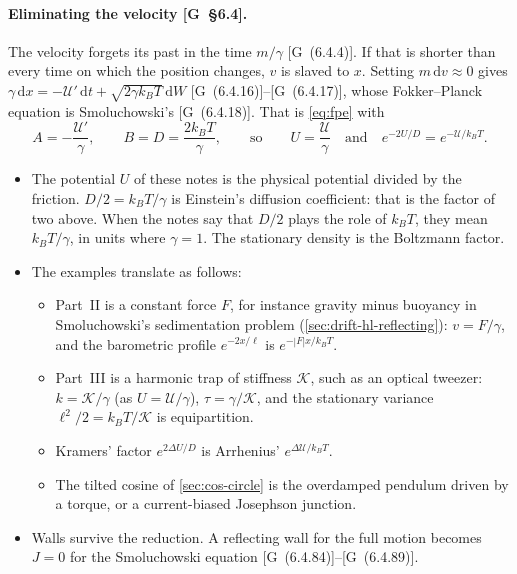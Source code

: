 \documentclass[11pt]{article}
\numberwithin{equation}{section}
\newcommand{\dd}{\mathrm{d}}
\newcommand{\G}[1]{[G~(#1)]}
\newcommand{\Gs}[1]{[G~\S#1]}
\begin{document}
\paragraph{Eliminating the velocity \Gs{6.4}.} The velocity forgets its past in the time $m/\gamma$ \G{6.4.4}. If
that is shorter than every time on which the position changes, $v$ is slaved to $x$. Setting $m\,\dd v\approx0$
gives $\gamma\,\dd x=-\mathcal U'\,\dd t+\sqrt{2\gamma k_BT}\,\dd W$ \G{6.4.16}--\G{6.4.17}, whose Fokker--Planck
equation is Smoluchowski's \G{6.4.18}. That is \cref{eq:fpe} with
\begin{equation}
  A=-\frac{\mathcal U'}{\gamma},\qquad B=D=\frac{2k_BT}{\gamma},\qquad\text{so}\qquad U=\frac{\mathcal U}{\gamma}
  \quad\text{and}\quad e^{-2U/D}=e^{-\mathcal U/k_BT}.
  \label{eq:dictionary}
\end{equation}
\begin{itemize}
  \item The potential $U$ of these notes is the physical potential divided by the friction. $D/2=k_BT/\gamma$ is
        Einstein's diffusion coefficient: that is the factor of two above. When the notes say that $D/2$ plays the
        role of $k_BT$, they mean $k_BT/\gamma$, in units where $\gamma=1$. The stationary density is the
        Boltzmann factor.
  \item The examples translate as follows:
        \begin{itemize}
          \item Part~II is a constant force $F$, for instance gravity minus buoyancy in Smoluchowski's
                sedimentation problem (\cref{sec:drift-hl-reflecting}): $v=F/\gamma$, and the barometric profile
                $e^{-2x/\ell}$ is $e^{-|F|x/k_BT}$.
          \item Part~III is a harmonic trap of stiffness $\mathcal K$, such as an optical tweezer:
                $k=\mathcal K/\gamma$ (as $U=\mathcal U/\gamma$), $\tau=\gamma/\mathcal K$, and the stationary
                variance $\ell^2/2=k_BT/\mathcal K$ is equipartition.
          \item Kramers' factor $e^{2\Delta U/D}$ is Arrhenius' $e^{\Delta\mathcal U/k_BT}$.
          \item The tilted cosine of \cref{sec:cos-circle} is the overdamped pendulum driven by a torque, or a
                current-biased Josephson junction.
        \end{itemize}
  \item Walls survive the reduction. A reflecting wall for the full motion becomes $J=0$ for the Smoluchowski
        equation \G{6.4.84}--\G{6.4.89}.
\end{itemize}
\end{document}
